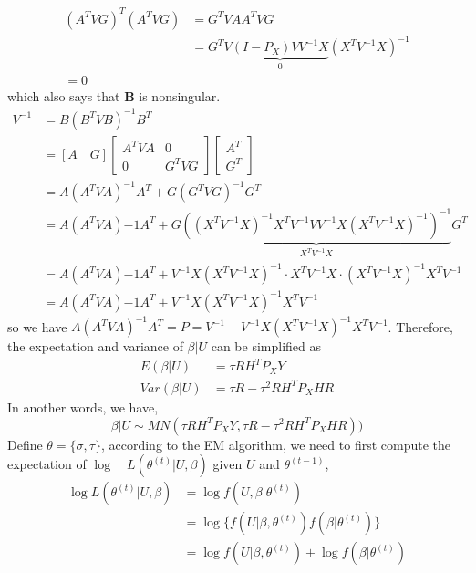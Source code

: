 \documentclass[12pt]{article}
\begin{document}
    \begin{align*}
        (A^TVG)^T(A^TVG)&=G^TVAA^TVG\\
        &=G^TV\underbrace{(I-P_X)VV^{-1}X}_{0}(X^TV^{-1}X)^{-1}\\
        =0
    \end{align*}
    which also says that \textbf{B} is nonsingular.
    \begin{align*}
        V^{-1}&=B(B^TVB)^{-1}B^T\\
        &=[A\quad G]\begin{bmatrix}
    A^TVA&0\\
    0&G^TVG
    \end{bmatrix}\begin{bmatrix}
    A^T\\
    G^T
    \end{bmatrix}\\
    &=A(A^TVA)^{-1}A^T+G(G^TVG)^{-1}G^T\\
    &=A(A^TVA){-1}A^T+G\underbrace{((X^TV^{-1}X)^{-1}X^TV^{-1}VV^{-1}X(X^TV^{-1}X)^{-1})^{-1}}_{X^TV^{-1}X}G^T\\
    &=A(A^TVA){-1}A^T+V^{-1}X(X^TV^{-1}X)^{-1}\cdot X^TV^{-1}X\cdot (X^TV^{-1}X)^{-1}X^TV^{-1}\\
    &=A(A^TVA){-1}A^T+V^{-1}X(X^TV^{-1}X)^{-1}X^TV^{-1}
    \end{align*}
    so we have $A(A^TVA)^{-1}A^T=P=V^{-1}-V^{-1}X(X^TV^{-1}X)^{-1}X^TV^{-1}$.
    Therefore, the expectation and variance of $\beta|U$ can be simplified as
    \begin{align*}
        E(\beta|U)&=\tau RH^TP_XY\\
        Var(\beta|U)&=\tau R-\tau^2 RH^TP_XHR
    \end{align*}
    In another words, we have,
    \begin{equation*}
    \beta|U\sim MN(\tau RH^TP_XY,\tau R-\tau^2 RH^TP_XHR))
    \end{equation*}
    Define $\theta=\{\sigma, \tau\}$, according to the EM algorithm, we need to first compute the expectation of $\log\quad L(\theta^{(t)}|U,\beta)$ given $U$ and $\theta^{(t-1)}$,
    \begin{equation*}
    \begin{split}
    \log L(\theta^{(t)}|U,\beta)&=\log f(U,\beta|\theta^{(t)})\\
    &=\log\{f(U|\beta,\theta^{(t)})f(\beta|\theta^{(t)})\}\\
    &=\log f(U|\beta,\theta^{(t)})+ \log f(\beta|\theta^{(t)})
    \end{split}
    \end{equation*}
\end{document}
